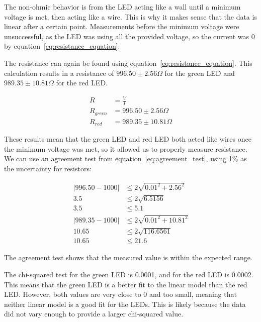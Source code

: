 \documentclass[11pt]{article}
\begin{document}
    The non-ohmic behavior is from the LED acting like a wall until a minimum voltage is met, then acting like a wire.
    This is why it makes sense that the data is linear after a certain point.
    Measurements before the minimum voltage were unsuccessful, as the LED was using all the provided voltage, so the current was 0 by equation~\ref{eq:resistance_equation}.

    The resistance can again be found using equation~\ref{eq:resistance_equation}.
    This calculation results in a resistance of $996.50 \pm 2.56 \Omega$ for the green LED and $989.35 \pm 10.81 \Omega$ for the red LED\@.
    \begin{e}
        \begin{align*}
            R &= \frac{V}{I} \\
            R_{green} &= 996.50 \pm2.56 \Omega \\
            R_{red} &= 989.35 \pm10.81 \Omega
        \end{align*}
    \end{e}

    These results mean that the green LED and red LED both acted like wires once the minimum voltage was met, so it
    allowed us to properly measure resistance.
    We can use an agreement test from equation~\ref{eq:agreement_test}, using 1\% as the uncertainty for resistors:
    \begin{e}
        \begin{align*}
            |996.50 - 1000| &\le 2 \sqrt{0.01^2 + 2.56^2} \\
            3.5 &\le 2 \sqrt{6.5156} \\
            3.5 &\le 5.1 \\
            |989.35 - 1000| &\le 2 \sqrt{0.01^2 + 10.81^2} \\
            10.65 &\le 2 \sqrt{116.6561} \\
            10.65 &\le 21.6
        \end{align*}
    \end{e}
    The agreement test shows that the measured value is within the expected range.

    The chi-squared test for the green LED is 0.0001, and for the red LED is 0.0002.
    This means that the green LED is a better fit to the linear model than the red LED\@.
    However, both values are very close to 0 and too small, meaning that neither linear model is a good fit for the LEDs.
    This is likely because the data did not vary enough to provide a larger chi-squared value.
\end{document}
